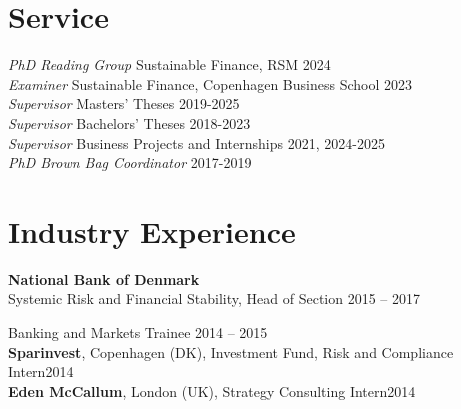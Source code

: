 \documentclass[11pt]{res} %
\newcommand{\fullhrulefill}{%
  \vspace{-1ex}%
  \hspace*{-\sectionwidth}\hrulefill%
  }
\begin{document}
\begin{resume}
\section{Service}
\fullhrulefill \newline
\textit{PhD Reading Group} Sustainable Finance, RSM \hfill 2024\\
\textit{Examiner} Sustainable Finance, Copenhagen Business School \hfill 2023\\
\textit{Supervisor} Masters' Theses \hfill 2019-2025\\
\textit{Supervisor} Bachelors' Theses \hfill 2018-2023\\
\textit{Supervisor} Business Projects and Internships \hfill 2021, 2024-2025\\
\textit{PhD Brown Bag Coordinator} \hfill 2017-2019

\vspace{0.2in} %

\section{Industry Experience}
\fullhrulefill \newline
%
{\bf National Bank of Denmark}\\
Systemic Risk and Financial Stability, Head of Section \hfill 2015 -- 2017

\vspace{-12pt} %

Banking and Markets Trainee \hfill 2014 -- 2015\\
{\bf Sparinvest}, Copenhagen (DK), Investment Fund, Risk and Compliance Intern\hfill 2014\\
{\bf Eden McCallum}, London (UK), Strategy Consulting Intern\hfill 2014


\end{resume}
\end{document}
